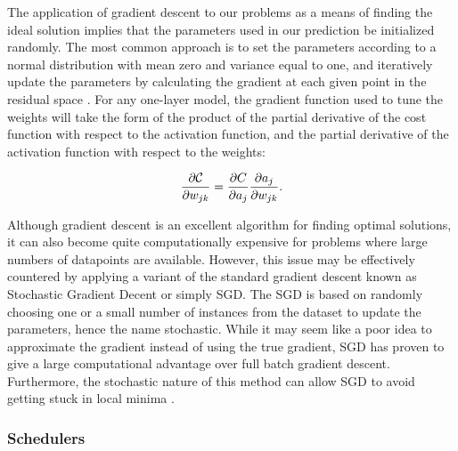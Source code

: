 \documentclass[onecolumn,10pt,cleanfoot]{asme2ej}
\begin{document}
The application of gradient descent to our problems as a means of finding the ideal solution implies that the parameters used in our prediction be initialized randomly. The most common approach is to set the parameters according to a normal distribution with mean zero and variance equal to one, and iteratively update the parameters by calculating the gradient at each given point in the residual space \cite[preface p. x]{dds}. For any one-layer model, the gradient function used to tune the weights will take the form of the product of the partial derivative of the cost function with respect to the activation function, and the partial derivative of the activation function with respect to the weights: 

\begin{equation}
\frac{\partial{\cal C}}{\partial w_{jk}}  = \frac{\partial C}{\partial a_{j}}\frac{\partial a_j}{\partial w_{jk}}.
\end{equation}

Although gradient descent is an excellent algorithm for finding optimal solutions, it can also become quite computationally expensive for problems where large numbers of datapoints are available. However, this issue may be effectively countered by applying a variant of the standard gradient descent known as Stochastic Gradient Decent or simply SGD. The SGD is based on randomly choosing one or a small number of instances from the dataset to update the parameters, hence the name stochastic. While it may seem like a poor idea to approximate the gradient instead of using the true gradient, SGD has proven to give a large computational advantage over full batch gradient descent. Furthermore, the stochastic nature of this method can allow SGD to avoid getting stuck in local minima \cite[46]{sr}.

\subsubsection{Schedulers}
\end{document}
